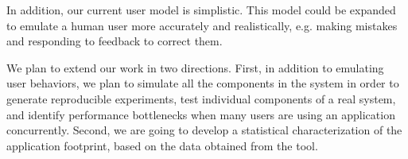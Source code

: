 In addition, our current user model is simplistic. 
This model could be expanded to emulate a human user more accurately and realistically, e.g. making mistakes and responding to feedback to correct them.

We plan to extend our work in two directions. First, in addition to emulating user behaviors, we plan to simulate all the components in the system in order to generate reproducible experiments, test individual components of a real system, and identify performance bottlenecks when many users are using an application concurrently. Second, we are going to develop a statistical characterization of the application footprint, based on the data obtained from the tool.
